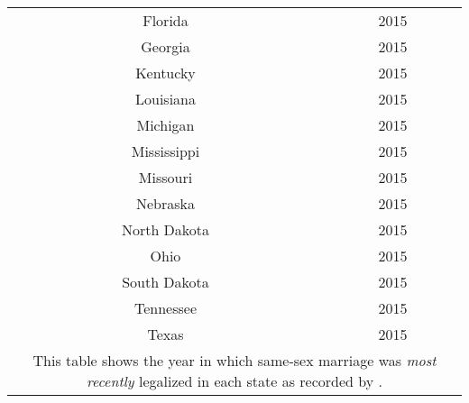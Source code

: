 \begin{spacing}{1}
\begin{longtable}{|c|c|}
Florida & 2015 \\
Georgia & 2015 \\
Kentucky & 2015 \\
Louisiana & 2015 \\
Michigan & 2015 \\
Mississippi & 2015 \\
Missouri & 2015 \\
Nebraska & 2015 \\
North Dakota & 2015 \\
Ohio & 2015 \\
South Dakota & 2015 \\
Tennessee & 2015 \\
Texas & 2015 \\
\hline
\multicolumn{2}{p{0.8\linewidth}}{\footnotesize This table shows the year in which same-sex marriage was \textit{most recently} legalized in each state as recorded by \citet{27}.} \\ 
\end{longtable}
\end{spacing}

